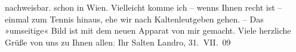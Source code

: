 \begin{ledgroupsized}[t]{13cm}
{{{                  nachweisbar.}}}\label{K_L03505-1h} schon in Wien. Vielleicht
               komme ich – wenns Ihnen recht ist – einmal zum Tennis hinaus, ehe wir nach Kaltenleutgeben gehen. – Das »umseitige« Bild
               ist mit dem neuen Apparat von mir gemacht. Viele herzliche Grüße von uns zu Ihnen
                  allen\textcolor{gray}{;} Ihr \spacefill\mbox{Salten}\pend
           \pstart
           Landro, 31. VII. 09\pend
           
         
         \endnumbering{}\end{ledgroupsized}  \newcommand{\dateiname}{L03505}\newcommand{\titel}{Felix Salten an Arthur Schnitzler, 31. 7. 1909}\newcommand{\editorInnen}{Martin Anton Müller und Laura Untner}
      